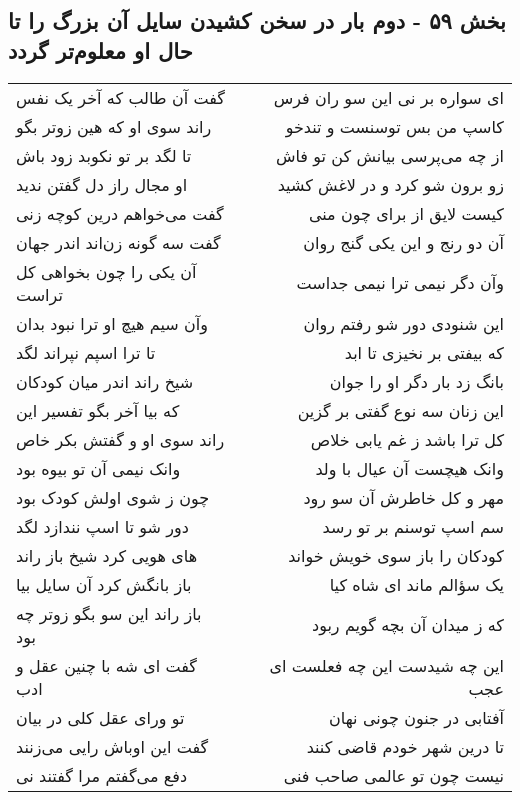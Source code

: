 \begin{center}
\section*{بخش ۵۹ - دوم بار در سخن کشیدن سایل آن بزرگ را تا حال او معلوم‌تر گردد}
\label{sec:sh059}
\begin{longtable}{l p{0.5cm} r}
گفت آن طالب که آخر یک نفس
&&
ای سواره بر نی این سو ران فرس
\\
راند سوی او که هین زوتر بگو
&&
کاسپ من بس توسنست و تندخو
\\
تا لگد بر تو نکوبد زود باش
&&
از چه می‌پرسی بیانش کن تو فاش
\\
او مجال راز دل گفتن ندید
&&
زو برون شو کرد و در لاغش کشید
\\
گفت می‌خواهم درین کوچه زنی
&&
کیست لایق از برای چون منی
\\
گفت سه گونه زن‌اند اندر جهان
&&
آن دو رنج و این یکی گنج روان
\\
آن یکی را چون بخواهی کل تراست
&&
وآن دگر نیمی ترا نیمی جداست
\\
وآن سیم هیچ او ترا نبود بدان
&&
این شنودی دور شو رفتم روان
\\
تا ترا اسپم نپراند لگد
&&
که بیفتی بر نخیزی تا ابد
\\
شیخ راند اندر میان کودکان
&&
بانگ زد بار دگر او را جوان
\\
که بیا آخر بگو تفسیر این
&&
این زنان سه نوع گفتی بر گزین
\\
راند سوی او و گفتش بکر خاص
&&
کل ترا باشد ز غم یابی خلاص
\\
وانک نیمی آن تو بیوه بود
&&
وانک هیچست آن عیال با ولد
\\
چون ز شوی اولش کودک بود
&&
مهر و کل خاطرش آن سو رود
\\
دور شو تا اسپ نندازد لگد
&&
سم اسپ توسنم بر تو رسد
\\
های هویی کرد شیخ باز راند
&&
کودکان را باز سوی خویش خواند
\\
باز بانگش کرد آن سایل بیا
&&
یک سؤالم ماند ای شاه کیا
\\
باز راند این سو بگو زوتر چه بود
&&
که ز میدان آن بچه گویم ربود
\\
گفت ای شه با چنین عقل و ادب
&&
این چه شیدست این چه فعلست ای عجب
\\
تو ورای عقل کلی در بیان
&&
آفتابی در جنون چونی نهان
\\
گفت این اوباش رایی می‌زنند
&&
تا درین شهر خودم قاضی کنند
\\
دفع می‌گفتم مرا گفتند نی
&&
نیست چون تو عالمی صاحب فنی
\\

\end{longtable}
\end{center}
